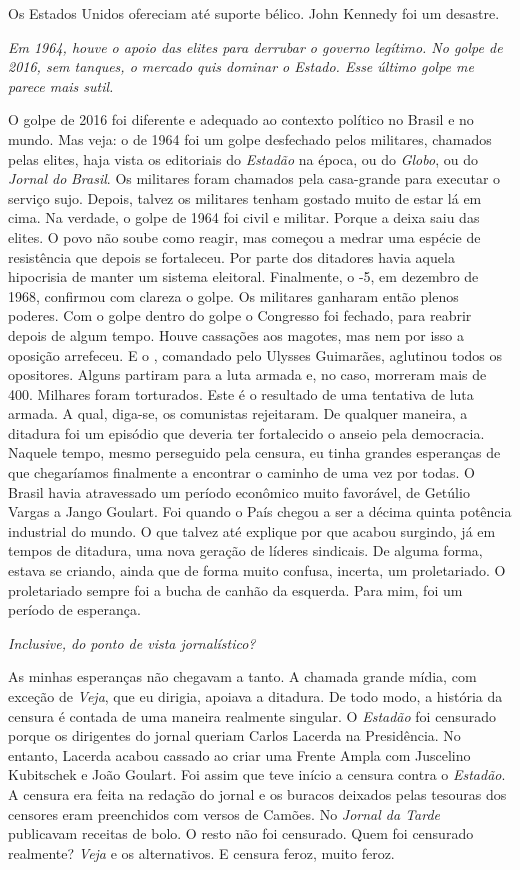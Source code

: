 \normalfont 
Os Estados Unidos ofereciam até suporte bélico. John
Kennedy foi um desastre.

\itshape
 Em 1964, houve o apoio das elites para derrubar o
governo legítimo. No golpe de 2016, sem tanques, o mercado quis dominar
o Estado. Esse último golpe me parece mais sutil.

\normalfont 
O golpe de 2016 foi diferente e adequado ao contexto
político no Brasil e no mundo. Mas veja: o de 1964 foi um golpe
desfechado pelos militares, chamados pelas elites, haja vista os
editoriais do \emph{Estadão} na época, ou do \emph{Globo}, ou do
\emph{Jornal do} \emph{Brasil}. Os militares foram chamados pela
casa-grande para executar o serviço sujo. Depois, talvez os militares
tenham gostado muito de estar lá em cima. Na verdade, o golpe de 1964
foi civil e militar. Porque a deixa saiu das elites. O povo não soube
como reagir, mas começou a medrar uma espécie de resistência que depois
se fortaleceu. Por parte dos ditadores havia aquela hipocrisia de manter
um sistema eleitoral. Finalmente, o -5, em dezembro de 1968, confirmou
com clareza o golpe. Os militares ganharam então plenos poderes. Com o
golpe dentro do golpe o Congresso foi fechado, para reabrir depois de
algum tempo. Houve cassações aos magotes, mas nem por isso a oposição
arrefeceu. E o , comandado pelo Ulysses Guimarães, aglutinou todos os
opositores. Alguns partiram para a luta armada e, no caso, morreram mais
de 400. Milhares foram torturados. Este é o resultado de uma tentativa
de luta armada. A qual, diga-se, os comunistas rejeitaram. De qualquer
maneira, a ditadura foi um episódio que deveria ter fortalecido o anseio
pela democracia. Naquele tempo, mesmo perseguido pela censura, eu tinha
grandes esperanças de que chegaríamos finalmente a encontrar o caminho
de uma vez por todas. O Brasil havia atravessado um período econômico
muito favorável, de Getúlio Vargas a Jango Goulart. Foi quando o País
chegou a ser a décima quinta potência industrial do mundo. O que talvez
até explique por que acabou surgindo, já em tempos de ditadura, uma nova
geração de líderes sindicais. De alguma forma, estava se criando, ainda
que de forma muito confusa, incerta, um proletariado. O proletariado
sempre foi a bucha de canhão da esquerda. Para mim, foi um período de
esperança.

\itshape
 Inclusive, do ponto de vista jornalístico?

\normalfont 
As minhas esperanças não chegavam a tanto. A chamada
grande mídia, com exceção de \emph{Veja}, que eu dirigia, apoiava a
ditadura. De todo modo, a história da censura é contada de uma maneira
realmente singular. O \emph{Estadão} foi censurado porque os dirigentes
do jornal queriam Carlos Lacerda na Presidência. No entanto, Lacerda
acabou cassado ao criar uma Frente Ampla com Juscelino Kubitschek e João
Goulart. Foi assim que teve início a censura contra o \emph{Estadão}. A
censura era feita na redação do jornal e os buracos deixados pelas
tesouras dos censores eram preenchidos com versos de Camões. No
\emph{Jornal da Tarde} publicavam receitas de bolo. O resto não foi
censurado. Quem foi censurado realmente? \emph{Veja} e os alternativos.
E censura feroz, muito feroz.

